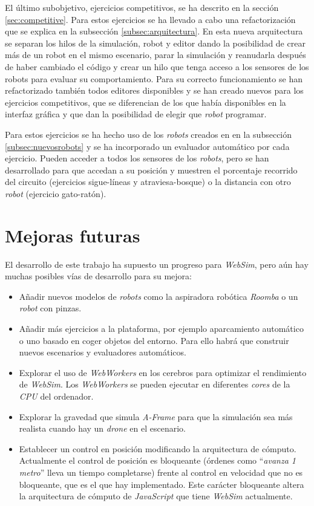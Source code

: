El último subobjetivo, ejercicios competitivos, se ha descrito en la sección \ref{sec:competitive}. Para estos ejercicios se ha llevado a cabo una refactorización que se explica en la subsección \ref{subsec:arquitectura}. En esta nueva arquitectura se separan los hilos de la simulación, robot y editor dando la posibilidad de crear más de un robot en el mismo escenario, parar la simulación y reanudarla después de haber cambiado el código y crear un hilo que tenga acceso a los sensores de los robots para evaluar su comportamiento. Para su correcto funcionamiento se han refactorizado también todos editores disponibles y se han creado nuevos para los ejercicios competitivos, que se diferencian de los que había disponibles en la interfaz gráfica y que dan la posibilidad de elegir que \textit{robot} programar.

Para estos ejercicios se ha hecho uso de los \textit{robots} creados en en la subsección \ref{subsec:nuevosrobots} y se ha incorporado un evaluador automático por cada ejercicio. Pueden acceder a todos los sensores de los \textit{robots}, pero se han desarrollado para que accedan a su posición y muestren el porcentaje recorrido del circuito (ejercicios sigue-líneas y atraviesa-bosque) o la distancia con otro \textit{robot} (ejercicio gato-ratón). \\

\section{Mejoras futuras}
\label{sec:mejoras_futuras}

El desarrollo de este trabajo ha supuesto un progreso para \textit{WebSim}, pero aún hay muchas posibles vías de desarrollo para su mejora:

\begin{itemize}
    \item Añadir nuevos modelos de \textit{robots} como la aspiradora robótica \textit{Roomba} o un \textit{robot} con pinzas. 
    \item Añadir más ejercicios a la plataforma, por ejemplo aparcamiento automático o uno basado en coger objetos del entorno. Para ello habrá que construir nuevos escenarios y evaluadores automáticos. 
    \item Explorar el uso de \textit{WebWorkers} en los cerebros para optimizar el rendimiento de \textit{WebSim}. Los \textit{WebWorkers} se pueden ejecutar en diferentes \textit{cores} de la \textit{CPU} del ordenador.
    \item Explorar la gravedad que simula \textit{A-Frame} para que la simulación sea más realista cuando hay un \textit{drone} en el escenario. 
    \item Establecer un control en posición modificando la arquitectura de cómputo. Actualmente el control de posición es bloqueante (órdenes como ``\textit{avanza 1 metro}'' lleva un tiempo completarse) frente al control en velocidad que no es bloqueante, que es el que hay implementado. Este carácter bloqueante altera la arquitectura de cómputo de \textit{JavaScript} que tiene \textit{WebSim} actualmente.
\end{itemize}